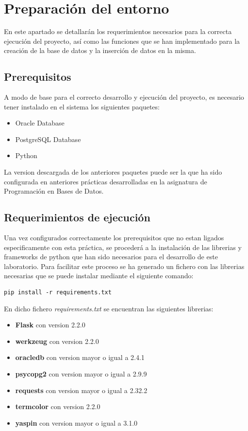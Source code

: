 \documentclass[a4paper,12pt]{article}
\begin{document}
        



\section{Preparación del entorno}
En este apartado se detallarán los requerimientos necesarios para la correcta ejecución del proyecto, 
así como las funciones que se han implementado para la creación de la base de datos y la inserción de datos en la misma.

\subsection{Prerequisitos}
A modo de base para el correcto desarrollo y ejecución del proyecto, es necesario tener instalado en el sistema los siguientes paquetes:
\begin{itemize}
    \item Oracle Database
    \item PostgreSQL Database
    \item Python 
\end{itemize}

La version descargada de los anteriores paquetes puede ser la que ha sido configurada en anteriores prácticas 
desarrolladas en la asignatura de Programación en Bases de Datos.

\subsection{Requerimientos de ejecución}
Una vez configurados correctamente los prerequisitos que no estan ligados especificamente con esta práctica,
se procederá a la instalación de las librerias y frameworks de python que han sido necesarios para el desarrollo de este laboratorio.
Para facilitar este proceso se ha generado un fichero con las librerias necesarias que se puede instalar mediante el siguiente comando:

\begin{lstlisting}[style=console]
    pip install -r requirements.txt
\end{lstlisting}

En dicho fichero \textit{requirements.txt} se encuentran las siguientes librerias:
\begin{itemize}
    \item \textbf{Flask} con version 2.2.0
    \item \textbf{werkzeug} con version 2.2.0
    \item \textbf{oracledb} con version mayor o igual a 2.4.1
    \item \textbf{psycopg2} con version mayor o igual a 2.9.9
    \item \textbf{requests} con version mayor o igual a 2.32.2
    \item \textbf{termcolor} con version 2.2.0
    \item \textbf{yaspin} con version mayor o igual a 3.1.0
\end{itemize}
\end{document}
